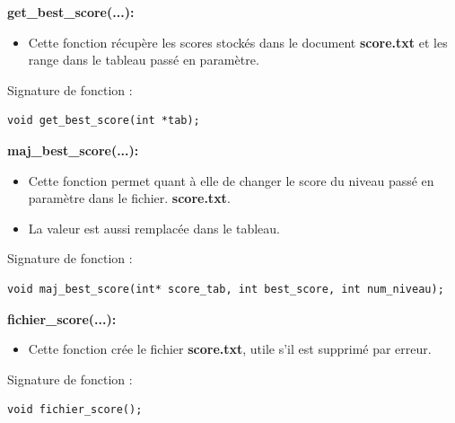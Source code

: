 \documentclass{article}
\begin{document}
\textbf{get\_best\_score(...):}
\begin{itemize}
\item Cette fonction récupère les scores stockés dans le document \textbf{score.txt} et les range dans le tableau passé en paramètre.
\end{itemize}
Signature de fonction :
\begin{lstlisting}
void get_best_score(int *tab);
\end{lstlisting}

\textbf{maj\_best\_score(...):}
\begin{itemize}
\item Cette fonction permet quant à elle de changer le score du niveau passé en paramètre dans le fichier. \textbf{score.txt}.
\item La valeur est aussi remplacée dans le tableau.
\end{itemize}
Signature de fonction :
\begin{lstlisting}
void maj_best_score(int* score_tab, int best_score, int num_niveau);
\end{lstlisting}

\textbf{fichier\_score(...):}
\begin{itemize}
\item Cette fonction crée le fichier \textbf{score.txt}, utile s'il est supprimé par erreur.
\end{itemize}
Signature de fonction :
\begin{lstlisting}
void fichier_score();
\end{lstlisting}

\newpage


\listoffigures
\end{document}
